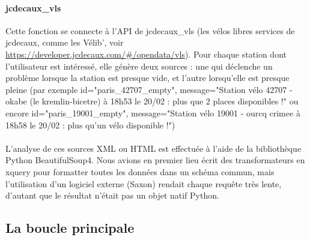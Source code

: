 \documentclass[a4paper, 12pt]{article}
\begin{document}
\paragraph{jcdecaux\_vls} Cette fonction se connecte à l'API de jcdecaux\_vls
(les vélos libres services de jcdecaux, comme les Vélib', voir
\url{https://developer.jcdecaux.com/#/opendata/vls}).
Pour chaque station dont l'utilisateur est intéressé, elle génère deux sources :
une qui déclenche un problème lorsque la station est presque vide, et l'autre
lorsqu'elle est presque pleine (par exemple id="paris\_42707\_empty",
message="Station vélo 42707 - okabe (le kremlin-bicetre) à 18h53 le 20/02 : plus
que 2 places disponibles !" ou encore id="paris\_19001\_empty", message="Station
vélo 19001 - ourcq crimee à 18h58 le 20/02 : plus qu'un vélo disponible !")

\paragraph{} L'analyse de ces sources XML ou HTML est effectuée à l'aide de la
bibliothèque Python BeautifulSoup4.
Nous avions en premier lieu écrit des transformateurs en xquery pour formatter
toutes les données dans un schéma commun, mais l'utilisation d'un logiciel
externe (Saxon) rendait chaque requête très lente, d'autant que le résultat
n'était pas un objet natif Python.

\subsection{La boucle principale}
\end{document}
